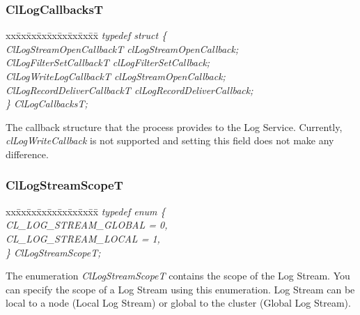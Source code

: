 \begin{flushleft}
\subsubsection{ClLogCallbacksT}
\begin{tabbing}
xx\=xx\=xx\=xx\=xx\=xx\=xx\=xx\=xx\=\kill
\textit{typedef struct \{}\\
\>\>\>\>\textit{ClLogStreamOpenCallbackT    clLogStreamOpenCallback;}\\
\>\>\>\>\textit{ClLogFilterSetCallbackT          clLogFilterSetCallback;}\\
\>\>\>\>\textit{ClLogWriteLogCallbackT         clLogStreamOpenCallback;}\\
\>\>\>\>\textit{ClLogRecordDeliverCallbackT	clLogRecordDeliverCallback;}\\
\textit{\} ClLogCallbacksT;}\end{tabbing}

The callback structure that the process provides to the Log Service. Currently, 
\textit{clLogWriteCallback} is not supported and setting this field does not 
make any difference.


\subsubsection{ClLogStreamScopeT}
\begin{tabbing}
xx\=xx\=xx\=xx\=xx\=xx\=xx\=xx\=xx\=\kill
\textit{typedef enum \{}\\
\>\>\>\>\textit{CL\_LOG\_STREAM\_GLOBAL = 0,}\\
\>\>\>\>\textit{CL\_LOG\_STREAM\_LOCAL = 1,}\\
\textit{\} ClLogStreamScopeT;}\end{tabbing}
The enumeration \textit{ClLogStreamScopeT} contains the scope of the Log Stream. You can specify the scope of a Log Stream using this enumeration.
Log Stream can be local to a node (Local Log Stream) or global to the cluster (Global Log Stream).



\end{flushleft}
